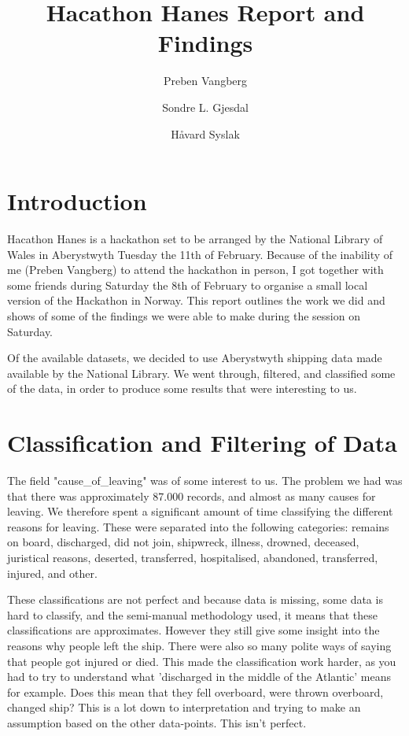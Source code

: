 \documentclass{article}
\author[1,3]{Preben Vangberg}
\author[2]{Sondre L. Gjesdal}
\author[3]{Håvard Syslak}
\affil[1]{Department of Computer Science, Aberystwyth University, Wales}
\affil[2]{Western Norway University of Applied Sciences, Norway}
\affil[3]{MMP PM MON MAIN AUT, Equinor ASA, Norway}
\title{Hacathon Hanes Report and Findings}
\begin{document}
\maketitle
\newpage

\section{Introduction}

Hacathon Hanes is a hackathon set to be arranged by the National Library of Wales in Aberystwyth Tuesday the 11th of February.
Because of the inability of me (Preben Vangberg) to attend the hackathon in person, I got together with some friends during Saturday the 8th of February to organise a small local version of the Hackathon in Norway.
This report outlines the work we did and shows of some of the findings we were able to make during the session on Saturday.

Of the available datasets, we decided to use Aberystwyth shipping data made available by the National Library.
We went through, filtered, and classified some of the data, in order to produce some results that were interesting to us.

\section{Classification and Filtering of Data}

The field "cause\_of\_leaving" was of some interest to us. The problem we had was that there was approximately 87.000 records, and almost as many causes for leaving. 
We therefore spent a significant amount of time classifying the different reasons for leaving.
These were separated into the following categories: remains on board, discharged, did not join, shipwreck, illness, drowned, deceased, juristical reasons, deserted, transferred, hospitalised, abandoned, transferred, injured, and other. 

These classifications are not perfect and because data is missing, some data is hard to classify, and the semi-manual methodology used, it means that these classifications are approximates. However they still give some insight into the reasons why people left the ship.
There were also so many polite ways of saying that people got injured or died.
This made the classification work harder, as you had to try to understand what 'discharged in the middle of the Atlantic' means for example.
Does this mean that they fell overboard, were thrown overboard, changed ship? This is a lot down to interpretation and trying to make an assumption based on the other data-points. This isn't perfect.
\end{document}
